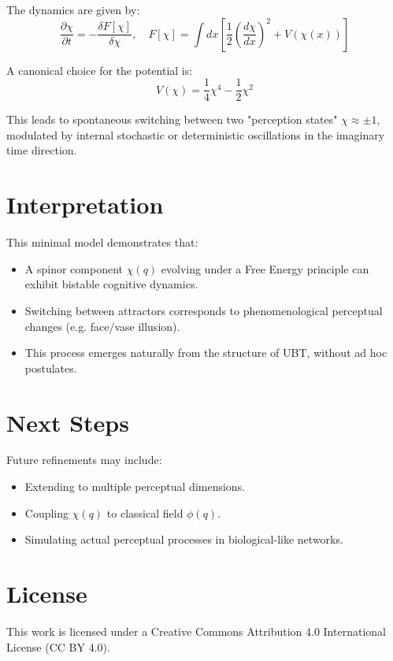 \documentclass[12pt]{article}
\begin{document}
The dynamics are given by:
\[
\frac{\partial \chi}{\partial t} = -\frac{\delta F[\chi]}{\delta \chi}, \quad
F[\chi] = \int dx \left[ \frac{1}{2} \left( \frac{d\chi}{dx} \right)^2 + V(\chi(x)) \right]
\]

A canonical choice for the potential is:
\[
V(\chi) = \frac{1}{4} \chi^4 - \frac{1}{2} \chi^2
\]

This leads to spontaneous switching between two "perception states" \(\chi \approx \pm 1\), modulated by internal stochastic or deterministic oscillations in the imaginary time direction.

\section{Interpretation}
This minimal model demonstrates that:
\begin{itemize}
    \item A spinor component \(\chi(q)\) evolving under a Free Energy principle can exhibit bistable cognitive dynamics.
    \item Switching between attractors corresponds to phenomenological perceptual changes (e.g. face/vase illusion).
    \item This process emerges naturally from the structure of UBT, without ad hoc postulates.
\end{itemize}

\section{Next Steps}
Future refinements may include:
\begin{itemize}
    \item Extending to multiple perceptual dimensions.
    \item Coupling \(\chi(q)\) to classical field \(\phi(q)\).
    \item Simulating actual perceptual processes in biological-like networks.
\end{itemize}


\section*{License}
This work is licensed under a Creative Commons Attribution 4.0 International License (CC BY 4.0).
\end{document}
